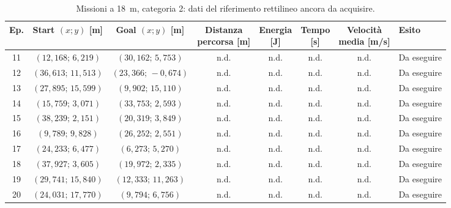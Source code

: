 \begin{table}[H]
\centering
\caption{Missioni a 18~m, categoria 2: dati del riferimento rettilineo ancora da acquisire.}
\label{tab:big-map-18m-baseline-cat2}
\begingroup
\fontsize{9}{11}\selectfont
\setlength{\tabcolsep}{2.5pt}
\renewcommand{\arraystretch}{1.2}
\begin{tabular}{@{}c cc cccc l@{}}
\toprule
Ep. & \shortstack{Start $(x;y)$\\{}[m]} & \shortstack{Goal $(x;y)$\\{}[m]} & \shortstack{Distanza\\percorsa [m]} & \shortstack{Energia\\{}[J]} & \shortstack{Tempo\\{}[s]} & \shortstack{Velocità\\media [m/s]} & Esito \\
\midrule
11 & $(12{,}168;\,6{,}219)$ & $(30{,}162;\,5{,}753)$ & n.d. & n.d. & n.d. & n.d. & Da eseguire \\
12 & $(36{,}613;\,11{,}513)$ & $(23{,}366;\,-0{,}674)$ & n.d. & n.d. & n.d. & n.d. & Da eseguire \\
13 & $(27{,}895;\,15{,}599)$ & $(9{,}902;\,15{,}110)$ & n.d. & n.d. & n.d. & n.d. & Da eseguire \\
14 & $(15{,}759;\,3{,}071)$ & $(33{,}753;\,2{,}593)$ & n.d. & n.d. & n.d. & n.d. & Da eseguire \\
15 & $(38{,}239;\,2{,}151)$ & $(20{,}319;\,3{,}849)$ & n.d. & n.d. & n.d. & n.d. & Da eseguire \\
16 & $(9{,}789;\,9{,}828)$ & $(26{,}252;\,2{,}551)$ & n.d. & n.d. & n.d. & n.d. & Da eseguire \\
17 & $(24{,}233;\,6{,}477)$ & $(6{,}273;\,5{,}270)$ & n.d. & n.d. & n.d. & n.d. & Da eseguire \\
18 & $(37{,}927;\,3{,}605)$ & $(19{,}972;\,2{,}335)$ & n.d. & n.d. & n.d. & n.d. & Da eseguire \\
19 & $(29{,}741;\,15{,}840)$ & $(12{,}333;\,11{,}263)$ & n.d. & n.d. & n.d. & n.d. & Da eseguire \\
20 & $(24{,}031;\,17{,}770)$ & $(9{,}794;\,6{,}756)$ & n.d. & n.d. & n.d. & n.d. & Da eseguire \\
\bottomrule
\end{tabular}
\endgroup
\end{table}

